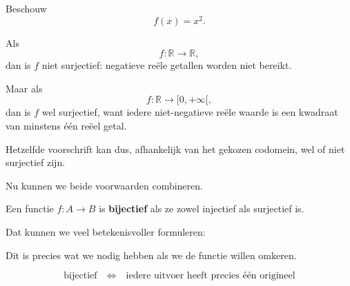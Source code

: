 \documentclass{ximera}
\begin{document}
\begin{voorbeeld}

Beschouw
\[
f(x)=x^2.
\]

Als
\[
f:\mathbb R\to\mathbb R,
\]
dan is \(f\) niet surjectief: negatieve reële getallen worden niet bereikt.

Maar als
\[
f:\mathbb R\to[0,+\infty[,
\]
dan is \(f\) wel surjectief, want iedere niet-negatieve reële waarde is een
kwadraat van minstens één reëel getal.

Hetzelfde voorschrift kan dus, afhankelijk van het gekozen codomein,
wel of niet surjectief zijn.
\end{voorbeeld}





Nu kunnen we beide voorwaarden combineren.

\begin{definitie}
Een functie \(f:A\to B\) is \textbf{bijectief} als ze zowel injectief
als surjectief is.
\end{definitie}

Dat kunnen we veel betekenisvoller formuleren:

\begin{center}
\end{center}

\begin{center}
\end{center}

Dit is precies wat we nodig hebben als we de functie willen omkeren.

\[
\boxed{
\text{bijectief}
\quad\Longleftrightarrow\quad
\text{iedere uitvoer heeft precies één origineel}
}
\]
\end{document}
